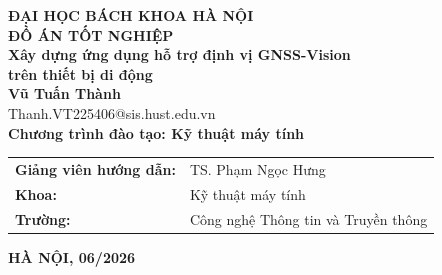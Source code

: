\documentclass[DoAn.tex]{subfiles}
\begin{document}
\begin{titlepage}
\thispagestyle{empty}
\begin{center}

{\textbf{\large{ĐẠI HỌC BÁCH KHOA HÀ NỘI}}}\\[4cm]

{\textbf{\huge{ĐỒ ÁN TỐT NGHIỆP}}}\\[1cm]
{\textbf{\Large{Xây dựng ứng dụng hỗ trợ định vị GNSS-Vision\\ trên thiết bị di động}}}\\[1cm]

{\textbf{\large{Vũ Tuấn Thành}}}\\
{\large{Thanh.VT225406@sis.hust.edu.vn}}\\[0.5cm]

{\textbf{\large{Chương trình đào tạo: Kỹ thuật máy tính}}}\\[1.8cm]

\begin{tabular}{ll}
\multicolumn{1}{c}{\textbf{Giảng viên hướng dẫn:}} & TS. Phạm Ngọc Hưng \\[0.5cm]
\textbf{Khoa:} & Kỹ thuật máy tính \\[0.5cm]
\textbf{Trường:} & Công nghệ Thông tin và Truyền thông
\end{tabular}

\vfill
{\textbf{HÀ NỘI, 06/2026}}
\end{center}

\end{titlepage}
\end{document}
